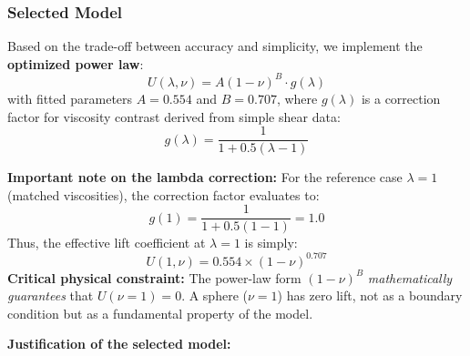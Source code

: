 \documentclass{article}
\begin{document}
\subsubsection{Selected Model}

Based on the trade-off between accuracy and simplicity, we implement the \textbf{optimized power law}:
\begin{equation}
    U(\lambda, \nu) = A (1 - \nu)^{B} \cdot g(\lambda)
    \label{eq:lift_model}
\end{equation}
with fitted parameters $A = 0.554$ and $B = 0.707$, where $g(\lambda)$ is a correction factor for viscosity contrast derived from simple shear data:
\begin{equation}
    g(\lambda) = \frac{1}{1 + 0.5(\lambda - 1)}
    \label{eq:lambda_correction}
\end{equation}

\textbf{Important note on the lambda correction:} For the reference case $\lambda = 1$ (matched viscosities), the correction factor evaluates to:
\begin{equation}
    g(1) = \frac{1}{1 + 0.5(1 - 1)} = 1.0
\end{equation}
Thus, the effective lift coefficient at $\lambda = 1$ is simply:
\begin{equation}
    U(1, \nu) = 0.554 \times (1-\nu)^{0.707}
\end{equation}
\textbf{Critical physical constraint:} The power-law form $(1-\nu)^B$ \emph{mathematically guarantees} that $U(\nu=1) = 0$. A sphere ($\nu = 1$) has zero lift, not as a boundary condition but as a fundamental property of the model.

\textbf{Justification of the selected model:}
\end{document}
